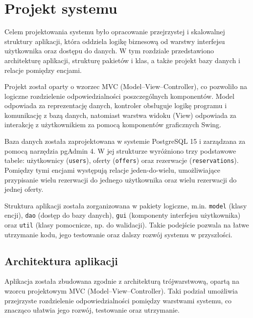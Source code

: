 \chapter{Projekt systemu}
\label{cha:Projekt systemu}

Celem projektowania systemu było opracowanie przejrzystej i skalowalnej struktury aplikacji, która oddziela logikę biznesową od warstwy interfejsu użytkownika oraz dostępu do danych. W tym rozdziale przedstawiono architekturę aplikacji, strukturę pakietów i klas, a także projekt bazy danych i relacje pomiędzy encjami.

Projekt został oparty o wzorzec MVC (Model–View–Controller), co pozwoliło na logiczne rozdzielenie odpowiedzialności poszczególnych komponentów. Model odpowiada za reprezentację danych, kontroler obsługuje logikę programu i komunikację z bazą danych, natomiast warstwa widoku (View) odpowiada za interakcję z użytkownikiem za pomocą komponentów graficznych Swing.

Baza danych została zaprojektowana w systemie PostgreSQL 15 i zarządzana za pomocą narzędzia pgAdmin 4. W jej strukturze wyróżniono trzy podstawowe tabele: użytkownicy (\texttt{users}), oferty (\texttt{offers}) oraz rezerwacje (\texttt{reservations}). Pomiędzy tymi encjami występują relacje jeden-do-wielu, umożliwiające przypisanie wielu rezerwacji do jednego użytkownika oraz wielu rezerwacji do jednej oferty.

Struktura aplikacji została zorganizowana w pakiety logiczne, m.in. \texttt{model} (klasy encji), \texttt{dao} (dostęp do bazy danych), \texttt{gui} (komponenty interfejsu użytkownika) oraz \texttt{util} (klasy pomocnicze, np. do walidacji). Takie podejście pozwala na łatwe utrzymanie kodu, jego testowanie oraz dalszy rozwój systemu w przyszłości.


\section{Architektura aplikacji}
\label{sec:Architektura aplikacji}

Aplikacja została zbudowana zgodnie z architekturą trójwarstwową, opartą na wzorcu projektowym MVC (Model–View–Controller). Taki podział umożliwia przejrzyste rozdzielenie odpowiedzialności pomiędzy warstwami systemu, co znacząco ułatwia jego rozwój, testowanie oraz utrzymanie.

